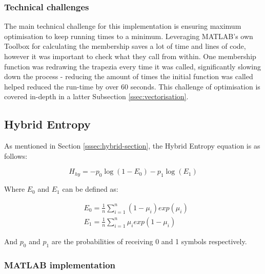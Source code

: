 \subsubsection{Technical challenges}

The main technical challenge for this implementation is ensuring maximum optimisation to keep running times to a minimum. Leveraging MATLAB's own Toolbox for calculating the membership saves a lot of time and lines of code, however it was important to check what they call from within. One membership function was redrawing the trapezia every time it was called, significantly slowing down the process - reducing the amount of times the initial function was called helped reduced the run-time by over 60 seconds. This challenge of optimisation is covered in-depth in a latter Subsection \ref{ssec:vectorisation}.

\newpage
\subsection{Hybrid Entropy}
\label{ssec:hybrid-sec}

As mentioned in Section \ref{sssec:hybrid-section}, the Hybrid Entropy equation is as follows:

\begin{equation}
  H_{hy} = -p_0\log(1 - E_0) - p_1\log(E_1)
\end{equation}

Where $E_0$ and $E_1$ can be defined as:

\begin{subequations} %
  \begin{align}
    &E_0 = \frac{1}{n}\displaystyle\sum_{i=1}^{n}{(1-\mu_i)exp(\mu_i)} \\
    &E_1 = \frac{1}{n}\displaystyle\sum_{i=1}^{n}{\mu_iexp(1-\mu_i)}
  \end{align}
\end{subequations}

And $p_0$ and $p_1$ are the probabilities of receiving 0 and 1 symbols respectively.

\subsubsection{MATLAB implementation}

